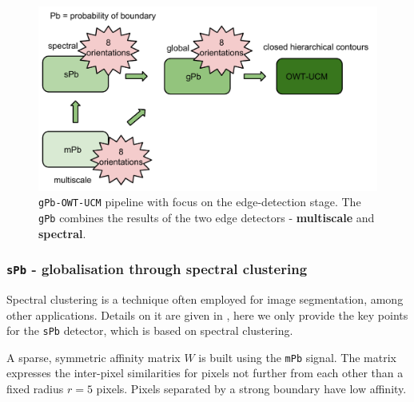 \begin{figure}[t]
\centering
\includegraphics[width=1\textwidth]{images/gPb-OWT-UCM/gPb-algorithm-details-mPb_sPb_gPb.pdf}
\caption[{\tt gPb-OWT-UCM} pipeline with focus on the edge-detection stage - {\tt gPb}]{{\tt gPb-OWT-UCM} pipeline with focus on the edge-detection stage. The {\tt gPb} combines the results of the two edge detectors - {\bf multiscale} and {\bf spectral}.}
\label{fig:gPb-algorithm-details-mPb_sPb_gPb}
\end{figure}

\subsubsection{{\tt sPb} - globalisation through spectral clustering}
\label{sec:ch3-sPb}

Spectral clustering is a technique often employed for image segmentation, among other applications. %
Details on it are given in \cite{Leung1998contour,Shi2000normalized,Fowlkes2003learning,Fowlkes04}, here we only provide the key %
points for the %
{\tt sPb} detector, which is based on %
spectral clustering. 

A sparse, symmetric affinity matrix $W$ is built using the {\tt mPb} signal. The matrix expresses the inter-pixel similarities for pixels not further from each other than a fixed radius $r=5$ pixels. Pixels separated by a strong boundary have low affinity.


